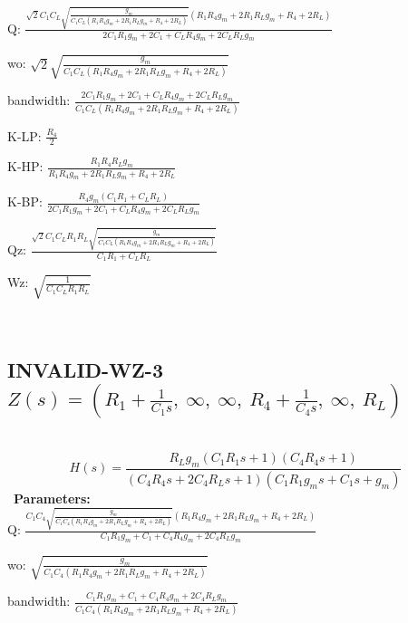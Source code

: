 \documentclass{article}
\begin{document}
Q: $\frac{\sqrt{2} C_{1} C_{L} \sqrt{\frac{g_{m}}{C_{1} C_{L} \left(R_{1} R_{4} g_{m} + 2 R_{1} R_{L} g_{m} + R_{4} + 2 R_{L}\right)}} \left(R_{1} R_{4} g_{m} + 2 R_{1} R_{L} g_{m} + R_{4} + 2 R_{L}\right)}{2 C_{1} R_{1} g_{m} + 2 C_{1} + C_{L} R_{4} g_{m} + 2 C_{L} R_{L} g_{m}}$\ 

wo: $\sqrt{2} \sqrt{\frac{g_{m}}{C_{1} C_{L} \left(R_{1} R_{4} g_{m} + 2 R_{1} R_{L} g_{m} + R_{4} + 2 R_{L}\right)}}$\ 

bandwidth: $\frac{2 C_{1} R_{1} g_{m} + 2 C_{1} + C_{L} R_{4} g_{m} + 2 C_{L} R_{L} g_{m}}{C_{1} C_{L} \left(R_{1} R_{4} g_{m} + 2 R_{1} R_{L} g_{m} + R_{4} + 2 R_{L}\right)}$\ 

K-LP: $\frac{R_{4}}{2}$\ 

K-HP: $\frac{R_{1} R_{4} R_{L} g_{m}}{R_{1} R_{4} g_{m} + 2 R_{1} R_{L} g_{m} + R_{4} + 2 R_{L}}$\ 

K-BP: $\frac{R_{4} g_{m} \left(C_{1} R_{1} + C_{L} R_{L}\right)}{2 C_{1} R_{1} g_{m} + 2 C_{1} + C_{L} R_{4} g_{m} + 2 C_{L} R_{L} g_{m}}$\ 

Qz: $\frac{\sqrt{2} C_{1} C_{L} R_{1} R_{L} \sqrt{\frac{g_{m}}{C_{1} C_{L} \left(R_{1} R_{4} g_{m} + 2 R_{1} R_{L} g_{m} + R_{4} + 2 R_{L}\right)}}}{C_{1} R_{1} + C_{L} R_{L}}$\ 

Wz: $\sqrt{\frac{1}{C_{1} C_{L} R_{1} R_{L}}}$\ 

\ 

\subsection{INVALID-WZ-3 $Z(s) = \left( R_{1} + \frac{1}{C_{1} s}, \  \infty, \  \infty, \  R_{4} + \frac{1}{C_{4} s}, \  \infty, \  R_{L}\right)$ } \ 
\textbf{\[H(s) = \frac{R_{L} g_{m} \left(C_{1} R_{1} s + 1\right) \left(C_{4} R_{4} s + 1\right)}{\left(C_{4} R_{4} s + 2 C_{4} R_{L} s + 1\right) \left(C_{1} R_{1} g_{m} s + C_{1} s + g_{m}\right)}\] } \ 
\textbf{Parameters:}\\ 

Q: $\frac{C_{1} C_{4} \sqrt{\frac{g_{m}}{C_{1} C_{4} \left(R_{1} R_{4} g_{m} + 2 R_{1} R_{L} g_{m} + R_{4} + 2 R_{L}\right)}} \left(R_{1} R_{4} g_{m} + 2 R_{1} R_{L} g_{m} + R_{4} + 2 R_{L}\right)}{C_{1} R_{1} g_{m} + C_{1} + C_{4} R_{4} g_{m} + 2 C_{4} R_{L} g_{m}}$\ 

wo: $\sqrt{\frac{g_{m}}{C_{1} C_{4} \left(R_{1} R_{4} g_{m} + 2 R_{1} R_{L} g_{m} + R_{4} + 2 R_{L}\right)}}$\ 

bandwidth: $\frac{C_{1} R_{1} g_{m} + C_{1} + C_{4} R_{4} g_{m} + 2 C_{4} R_{L} g_{m}}{C_{1} C_{4} \left(R_{1} R_{4} g_{m} + 2 R_{1} R_{L} g_{m} + R_{4} + 2 R_{L}\right)}$\ 
\end{document}
